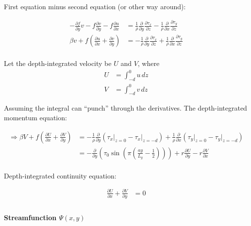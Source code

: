 \documentclass[11pt]{article}
\begin{document}
First equation minus second equation (or other way around):

\begin{align*}
-\frac{\partial f}{\partial y}v - f \frac{\partial v}{\partial y} - f \frac{\partial u}{\partial x} &= \frac{1}{\rho} \frac{\partial}{\partial y} \frac{\partial \tau_x}{\partial z} - \frac{1}{\rho} \frac{\partial}{\partial x} \frac{\partial \tau_y}{\partial z}\\
\beta v + f \left(\frac{\partial u}{\partial x} + \frac{\partial v}{\partial y} \right) &= -\frac{1}{\rho} \frac{\partial}{\partial y} \frac{\partial \tau_x}{\partial z} + \frac{1}{\rho} \frac{\partial}{\partial x} \frac{\partial \tau_y}{\partial z} \\
\end{align*}

Let the depth-integrated velocity be \(U\) and \(V\), where
\begin{align*}
U &= \int_{-d}^{0} u \, dz\\
V &= \int_{-d}^{0} v \, dz
\end{align*}

Assuming the integral can ``punch'' through the derivatives. The
depth-integrated momentum equation:

\begin{align*}
    \Longrightarrow \beta V + f \left( \frac{\partial U}{\partial x} + \frac{\partial V}{\partial y} \right) &= - \frac{1}{\rho} \frac{\partial}{\partial y} \left(\tau_x \biggr|_{z=0} -  \tau_x \biggr|_{z=-d}   \right) + \frac{1}{\rho} \frac{\partial}{\partial x} \left(\tau_y \biggr|_{z=0} - \tau_y \biggr|_{z=-d} \right)  \\
     &= - \frac{\partial}{\partial y} \left( \tau_0 \sin{\left( \pi \left( \frac{a y}{L_y} - \frac{1}{2} \right) \right)} \right) + r\frac{\partial U}{\partial y} - r\frac{\partial V}{\partial x}   \\
\end{align*}

Depth-integrated continuity equation:

\begin{align*}
\frac{\partial U}{\partial x} +  \frac{\partial V}{\partial y} &= 0 \\
\end{align*}

    \hypertarget{streamfunction-psixy}{%
\paragraph{\texorpdfstring{Streamfunction
\(\Psi(x,y)\)}{Streamfunction \textbackslash{}Psi(x,y)}}\label{streamfunction-psixy}}
\end{document}
